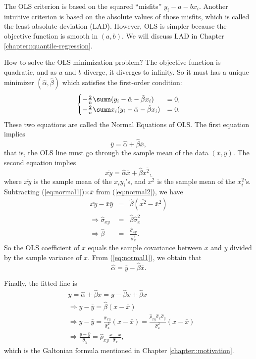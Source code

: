 The OLS criterion is based on the squared ``misfits''
$y_{i}- a - b  x_{i}$. Another intuitive criterion is based
on the absolute values of those misfits, which is called the least
absolute deviation (LAD). However, OLS is simpler because the objective
function is smooth in $(a, b)$. We will discuss LAD in Chapter \ref{chapter::quantile-regression}. 


How to solve the OLS minimization problem? The objective function
is quadratic, and as $a$ and $b$ diverge, it diverges to
infinity. So it must has a unique minimizer $(\hat{\alpha},\hat{\beta})$
which satisfies the first-order condition:
\[
\begin{cases}
-\frac{2}{n}\sumn(y_{i}-\hat{\alpha}-\hat{\beta}x_{i}) & =0,\\
-\frac{2}{n}\sumn x_{i}(y_{i}-\hat{\alpha}-\hat{\beta}x_{i}) & =0.
\end{cases}
\]
These two equations are called the Normal Equations of OLS. The first
equation implies 
\begin{equation}
\bar{y}=\hat{\alpha}+\hat{\beta}\bar{x},\label{eq:normal1}
\end{equation}
that is, the OLS line must go through the sample mean of the data
$(\bar{x},\bar{y}).$ The second equation implies
\begin{equation}
\overline{xy}=\hat{\alpha}\bar{x}+\hat{\beta}\overline{x^{2},}\label{eq:normal2}
\end{equation}
where $\overline{xy}$ is the sample mean of the $x_{i}y_{i}$'s, and $\overline{x^{2}}$
is the sample mean of the $x_{i}^{2}$'s. Subtracting (\ref{eq:normal1})$\times\bar{x}$
from (\ref{eq:normal2}), we have
\begin{eqnarray*}
\overline{xy} - \bar{x} \bar{y} &=& \hat{\beta} ( \overline{x^{2}} - \bar{x}^2 ) \\
\Longrightarrow \hat{\sigma}_{xy} &=&\hat{\beta} \hat{\sigma}_{x}^2  \\
\Longrightarrow \hat{\beta}&=&  \frac{\hat{\sigma}_{xy}}{\hat{\sigma}_{x}^2}. 
\end{eqnarray*}
So the OLS coefficient of $x$ equals the sample covariance between
$x$ and $y$ divided by the sample variance of $x$. From (\ref{eq:normal1}),
we obtain that 
\[
\hat{\alpha}=\bar{y}-\hat{\beta}\bar{x}.
\]

Finally, the fitted line is
\begin{align*}
&y  =\hat{\alpha}+\hat{\beta}x=\bar{y}-\hat{\beta}\bar{x}+\hat{\beta}x\\
&\Longrightarrow y-\bar{y}=\hat{\beta}(x-\bar{x})\\
 & \Longrightarrow y-\bar{y}= \frac{   \hat{\sigma}_{xy}  }{  \hat{\sigma}_{x}^2  }(x-\bar{x})
 =\frac{  \hat{\rho}_{xy} \hat{\sigma}_{x}\hat{\sigma}_{y}}{\hat{\sigma}_{x}^{2}}(x-\bar{x})\\
 & \Longrightarrow\frac{y-\bar{y}}{\hat{\sigma}_{y}}= \hat{\rho}_{xy}  \frac{x-\bar{x}}{\hat{\sigma}_{x}},
\end{align*}
which is the Galtonian formula mentioned in Chapter \ref{chapter::motivation}. 

